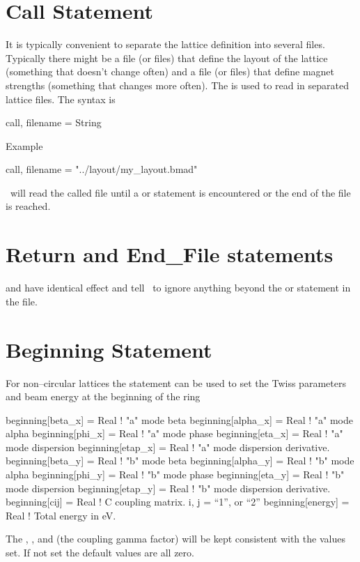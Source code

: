 \section{Call Statement}

It is typically convenient to separate the lattice definition into several files.
Typically there might be a file (or files) that define the layout of the lattice
(something that doesn't change often) and a file (or files) that define magnet strengths
(something that changes more often).
The  is used to read in separated lattice files. The syntax is
\begin{example}
  call, filename = String
\end{example}
Example
\begin{example}
  call, filename = "../layout/my_layout.bmad"
\end{example}
\bmad\ will read the called file until a  or  statement is encountered
or the end of the file is reached.

\section{Return and End\_File statements}

 and  have identical effect and tell \bmad\ to ignore anything
beyond the  or  statement in the file.

\section{Beginning Statement}

For non--circular lattices the  statement can be used to set the Twiss parameters 
and beam energy at the beginning of the ring 
\begin{example}
  beginning[beta_x]  = Real  ! "a" mode beta
  beginning[alpha_x] = Real  ! "a" mode alpha
  beginning[phi_x]   = Real  ! "a" mode phase
  beginning[eta_x]   = Real  ! "a" mode dispersion
  beginning[etap_x]  = Real  ! "a" mode dispersion derivative.
  beginning[beta_y]  = Real  ! "b" mode beta
  beginning[alpha_y] = Real  ! "b" mode alpha
  beginning[phi_y]   = Real  ! "b" mode phase
  beginning[eta_y]   = Real  ! "b" mode dispersion
  beginning[etap_y]  = Real  ! "b" mode dispersion derivative.
  beginning[cij]     = Real  ! C coupling matrix. i, j = {``1'', or ``2''} 
  beginning[energy]  = Real  ! Total energy in eV.
\end{example}
The , , and  (the coupling gamma factor) 
will be kept consistent with the values set. If not set the default values are all zero. 

